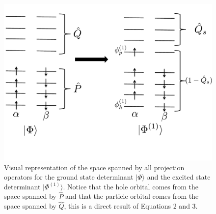 \documentclass[12pt]{article}
\begin{document}
\begin{figure}
\includegraphics[scale=0.35]{Figure1.pdf}
\caption{Visual representation of the space spanned by all projection operators for the ground state determinant $|\Phi\rangle$ and the excited state determinant $|\Phi^{(1)}\rangle$. Notice that the hole orbital comes from the space spanned by $\hat{P}$ and that the particle orbital comes from the space spanned by  $\hat{Q}$, this is a direct result of Equations 2 and 3.}
\label{fig:projection}
\end{figure}
\end{document}
